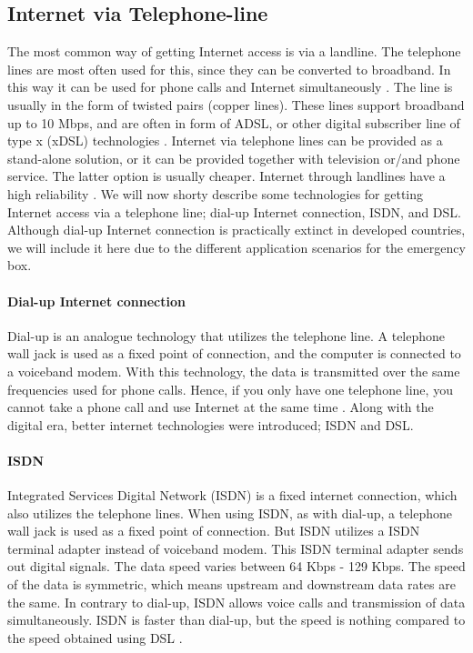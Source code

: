 
\subsection{Internet via Telephone-line}
The most common way of getting Internet access is via a landline. The telephone lines are most often used for this, since they can be converted to broadband. In this way it can be used for phone calls and Internet simultaneously \cite{internet}. The line is usually in the form of twisted pairs (copper lines). These lines support broadband up to 10 Mbps, and are often in form of ADSL, or other digital subscriber line of type x (xDSL) technologies \citep{audestad}. Internet via telephone lines can be provided as a stand-alone solution, or it can be provided together with television or/and phone service. The latter option is usually cheaper. Internet through landlines have a high reliability \cite{cablevssatellite}. We will now shorty describe some technologies for getting Internet access via a telephone line; dial-up Internet connection, ISDN, and DSL. Although dial-up Internet connection is practically extinct in developed countries, we will include it here due to the different application scenarios for the emergency box. 

\paragraph{Dial-up Internet connection}
Dial-up is an analogue technology that utilizes the telephone line. A telephone wall jack is used as a fixed point of connection, and the computer is connected to a voiceband modem. With this technology, the data is transmitted over the same frequencies used for phone calls. Hence, if you only have one telephone line, you cannot take a phone call and use Internet at the same time \cite{differentuplinks}. Along with the digital era, better internet technologies were introduced; ISDN and DSL. 

\paragraph{ISDN}
Integrated Services Digital Network (ISDN) is a fixed internet connection, which also utilizes the telephone lines. When using ISDN, as with dial-up, a telephone wall jack is used as a fixed point of connection. But ISDN utilizes a ISDN terminal adapter instead of voiceband modem. This ISDN terminal adapter sends out digital signals. The data speed varies between 64 Kbps - 129 Kbps. The speed of the data is symmetric, which means upstream and downstream data rates are the same. In contrary to dial-up, ISDN allows voice calls and transmission of data simultaneously. ISDN is faster than dial-up, but the speed is nothing compared to the speed obtained using DSL \cite{differentuplinks}. 

